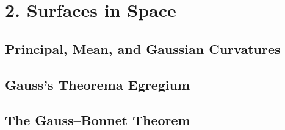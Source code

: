 
\section[Lecture 3--{Surfaces in Space}]{2. Surfaces in Space}

\subsection{Principal, Mean, and Gaussian Curvatures}

\subsection{Gauss's Theorema Egregium}

\subsection{The Gauss--Bonnet Theorem}